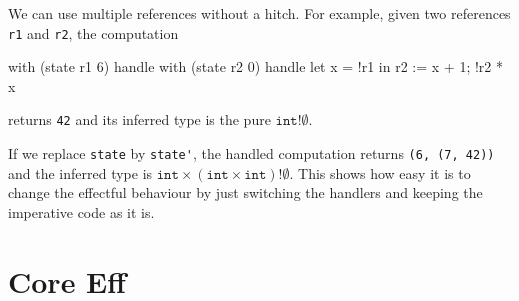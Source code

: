 \documentclass{LMCS}
\newcommand{\type}[1]{\mathtt{#1}}
\newcommand{\E}{\mathrel{!}}
\let\inline\lstinline
\begin{document}
We can use multiple references without a hitch.
For example, given two references \inline{r1} and \inline{r2}, the computation
\begin{source}
  with (state r1 6) handle
    with (state r2 0) handle
      let x = !r1 in
      r2 := x + 1;
      !r2 * x
\end{source}
returns \inline{42} and its inferred type is the pure $\type{int} \E \emptyset$.

If we replace \inline{state} by \inline{state'},
the handled computation returns \inline{(6, (7, 42))} and the inferred type is $\type{int} \times (\type{int} \times \type{int}) \E \emptyset$.
This shows how easy it is to change the effectful behaviour by just switching the handlers and keeping the imperative code as it is.

\section{Core Eff}
\label{sec:core-eff}
\end{document}
